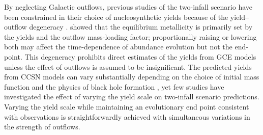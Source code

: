 \documentclass[twocolumn,twocolappendix,linenumbers]{aastex631}
\newcommand{\aFe}{[$\alpha$/Fe]\xspace}
\begin{document}
By neglecting Galactic outflows, previous studies of the two-infall scenario have been constrained in their choice of nucleosynthetic yields \citep{francois_evolution_2004} because of the yield--outflow degeneracy \citep[e.g.,][]{hartwick_chemical_1976,cooke_primordial_2022,johnson_dwarf_2023,sandford_strong_2024}. \citet{weinberg_equilibrium_2017} showed that the equilibrium metallicity is primarily set by the yields and the outflow mass-loading factor; proportionally raising or lowering both may affect the time-dependence of abundance evolution but not the end-point. This degeneracy prohibits direct estimates of the yields from GCE models unless the effect of outflows is assumed to be insignificant. The predicted yields from CCSN models can vary substantially depending on the choice of initial mass function \citep{vincenzo_modern_2016} and the physics of black hole formation \citep{griffith_impact_2021}, yet few studies have investigated the effect of varying the yield scale on two-infall scenario predictions. Varying the yield scale while maintaining an evolutionary end point consistent with observations is straightforwardly achieved with simultaneous variations in the strength of outflows.

\end{document}
